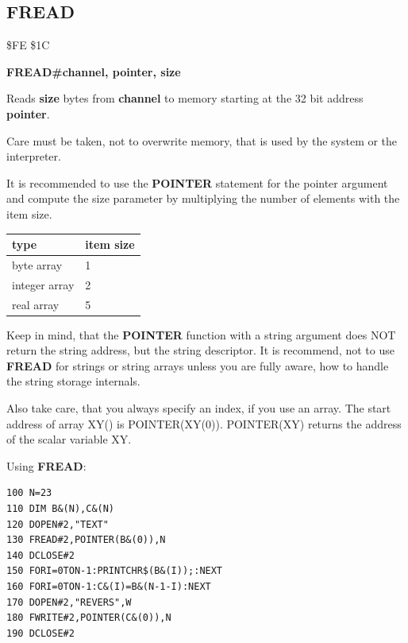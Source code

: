 \subsection{FREAD}
\begin{description}[leftmargin=2cm,style=nextline]
\item [Token:] \$FE \$1C
\item [Format:] {\bf FREAD\#channel, pointer, size}
\item [Usage:] Reads {\bf size} bytes from {\bf channel} to memory
               starting at the 32 bit address {\bf pointer}.

               Care must be taken, not to overwrite memory,
               that is used by the system or the interpreter.

               It is recommended to use the {\bf POINTER} statement
               for the pointer argument and compute the size parameter
               by multiplying the number of elements with the item size.

{\ttfamily
\setlength{\tabcolsep}{1mm}
\begin{tabular}{|l|l|}
\hline
 type          & item size \\
\hline
byte     array &  1     \\
integer  array &  2     \\
real     array &  5     \\
\hline
\end{tabular}
}

Keep in mind, that the {\bf POINTER} function with a string argument
does NOT return the string address, but the string descriptor.
It is recommend, not to use {\bf FREAD} for strings or string arrays
unless you are fully aware, how to handle the string storage internals.

Also take care, that you always specify an index, if you use an array.
The start address of array XY() is POINTER(XY(0)).
POINTER(XY) returns the address of the scalar variable XY.

\item [Example:] Using {\bf FREAD}:
\begin{tcolorbox}[colback=black,coltext=white]
\verbatimfont{\codefont}
\begin{verbatim}
100 N=23
110 DIM B&(N),C&(N)
120 DOPEN#2,"TEXT"
130 FREAD#2,POINTER(B&(0)),N
140 DCLOSE#2
150 FORI=0TON-1:PRINTCHR$(B&(I));:NEXT
160 FORI=0TON-1:C&(I)=B&(N-1-I):NEXT
170 DOPEN#2,"REVERS",W
180 FWRITE#2,POINTER(C&(0)),N
190 DCLOSE#2
\end{verbatim}
\end{tcolorbox}
\end{description}

